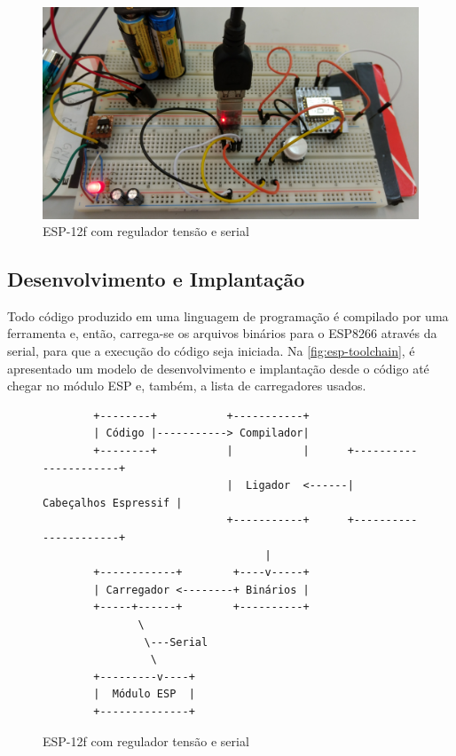 \begin{figure}[htb]
	\caption{\label{fig:esp-pilha-serial}ESP-12f com regulador tensão e serial}
	\begin{center}
		\includegraphics[width=1\textwidth]{040-plataformas/esp-dev/breadboard.jpg}
	\end{center}
\end{figure}


\subsection{Desenvolvimento e Implantação}
\label{subsec:dev-esp}

Todo código produzido em uma linguagem de programação é compilado por uma
ferramenta e, então, carrega-se os arquivos binários para o ESP8266 através da
serial, para que a execução do código seja iniciada. Na
\autoref{fig:esp-toolchain}, é apresentado um modelo de desenvolvimento e
implantação desde o código até chegar no módulo ESP e, também, a lista de
carregadores usados.

\begin{figure}[htb]
	\caption{\label{fig:esp-toolchain}ESP-12f com regulador tensão e serial}
	\begin{center}
		\begin{verbatim}
		+--------+           +-----------+
		| Código |-----------> Compilador|
		+--------+           |           |      +----------------------+
		                     |  Ligador  <------| Cabeçalhos Espressif |
		                     +-----------+      +----------------------+
		                           |
		+------------+        +----v-----+
		| Carregador <--------+ Binários |
		+-----+------+        +----------+
		       \
		        \---Serial
		         \
		+---------v----+
		|  Módulo ESP  |
		+--------------+
		\end{verbatim}
	\end{center}
\end{figure}


